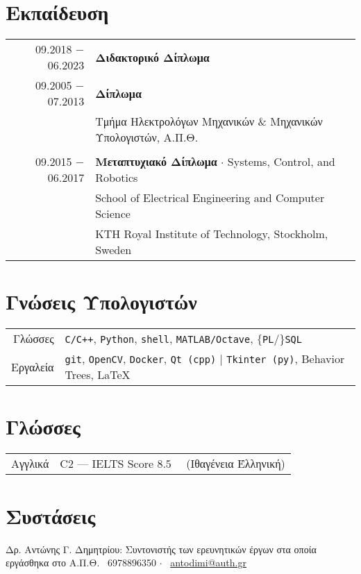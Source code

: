 \documentclass[a4paper,10pt,twoside]{article}
\begin{document}
\section{Εκπαίδευση}
\begin{tabular}{rp{11cm}}
09.2018 $-$ 06.2023 & \textbf{Διδακτορικό Δίπλωμα} \\
09.2005 $-$ 07.2013 & \textbf{Δίπλωμα} \\
                    & Τμήμα Ηλεκτρολόγων Μηχανικών \& Μηχανικών Υπολογιστών, Α.Π.Θ.\\
&\\
09.2015 $-$ 06.2017 & \textbf{Μεταπτυχιακό Δίπλωμα} $\cdot$ Systems, Control, and Robotics\\
                    & School of Electrical Engineering and Computer Science \\
                    & KTH Royal Institute of Technology, Stockholm, Sweden
\end{tabular}


\section{Γνώσεις Υπολογιστών}
\begin{tabular}{rp{12cm}}
Γλώσσες & \texttt{C/C++}, \texttt{Python}, \texttt{shell}, \texttt{MATLAB/Octave}, $\{$\texttt{PL}/$\}$\texttt{SQL}\\
Εργαλεία & \texttt{git}, \texttt{OpenCV}, \texttt{Docker}, \texttt{Qt (cpp)} | \texttt{Tkinter (py)}, Behavior Trees, \LaTeX \\
\end{tabular}



\section{Γλώσσες}

\begin{tabular}{rp{12cm}}
  Αγγλικά & C2 --- IELTS Score $8.5$ \ \ (Ιθαγένεια Έλληνική)
\end{tabular}

\section{Συστάσεις}
\noindent Δρ. Αντώνης Γ. Δημητρίου: Συντονιστής των ερευνητικών έργων στα οποία εργάσθηκα στο Α.Π.Θ. \hspace{1cm}
\faPhone \ 6978896350 $\cdot$ \faEnvelopeO \ \href{mailto:antodimi@auth.gr}{antodimi@auth.gr}
\end{document}
